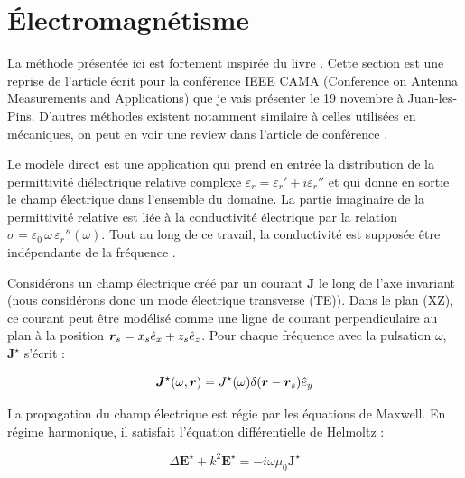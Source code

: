 \section{Électromagnétisme}

La méthode présentée ici est fortement inspirée du livre \cite{chew1999waves}. Cette section est une reprise de l'article écrit pour la conférence IEEE CAMA (Conference on Antenna Measurements and Applications) que je vais présenter le 19 novembre à Juan-les-Pins. D'autres méthodes existent notamment similaire à celles utilisées en mécaniques, on peut en voir une review dans l'article de conférence \cite{Ursin}. \par 

Le modèle direct est une application qui prend en entrée la distribution de la permittivité diélectrique relative complexe $\varepsilon_r=\varepsilon_r' + i \varepsilon_r'' $ et qui donne en sortie le champ électrique dans l'ensemble du domaine.
La partie imaginaire de la permittivité relative est liée à la conductivité électrique par la relation $\sigma = \varepsilon_0 \, \omega \, \varepsilon_r''(\omega)$.
Tout au long de ce travail, la conductivité est supposée être indépendante de la fréquence \cite{Debye,li2009electromagnetic} .\par

Considérons un champ électrique créé par un courant $\bm{J}$ le long de l'axe invariant (nous considérons donc un mode électrique transverse (TE)). Dans le plan (XZ), ce courant peut être modélisé comme une ligne de courant perpendiculaire au plan à la position $\bm{r}_s =x_s \hat{e}_x +z_s \hat{e}_z$. Pour chaque fréquence avec la pulsation $\omega$, $\bm{J}^\star$ s'écrit :

\begin{equation}
     \bm{J}^\star(\omega,\bm{r}) = J^\star(\omega) \delta(\bm{r}-\bm{r}_s) \hat{e}_y
\end{equation}

La propagation du champ électrique est régie par les équations de Maxwell. En régime harmonique, il satisfait l'équation différentielle de Helmoltz :

\begin{equation}
    \Delta \bm{E}^\star + k^2 \bm{E}^\star = -i\omega\mu_0 \bm{J}^\star
     \label{eq:Helmoltz}
\end{equation}

